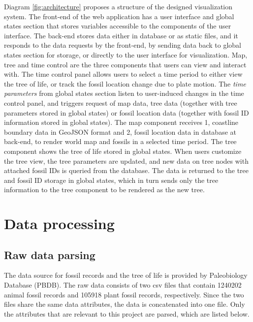 \documentclass[11pt, a4paper,oneside,chapterprefix=false]{scrbook}
\begin{document}
Diagram \ref{fig:architecture} proposes a structure of the designed visualization system. The front-end of the web application has a user interface and global states section that stores variables accessible to the components of the user interface. The back-end stores data either in database or as static files, and it responds to the data requests by the front-end, by sending data back to global states section for storage, or directly to the user interface for visualization. Map, tree and time control are the three components that users can view and interact with. The time control panel allows users to select a time period to either view the tree of life, or track the fossil location change due to plate motion. The \emph{time parameters} from global states section listen to user-induced changes in the time control panel, and triggers request of map data, tree data (together with tree parameters stored in global states) or fossil location data (together with fossil ID information stored in global states). The map component receives 1, coastline boundary data in GeoJSON format and 2, fossil location data in database at back-end, to render world map and fossils in a selected time period. The tree component shows the tree of life stored in global states. When users customize the tree view, the tree parameters are updated, and new data on tree nodes with attached fossil IDs is queried from the database. The data is returned to the tree and fossil ID storage in global states, which in turn sends only the tree information to the tree component to be rendered as the new tree. 

\section{Data processing} \label{sec:tec_data_processing}
\subsection{Raw data parsing} \label{subsec:raw_data_parsing}
The data source for fossil records and the tree of life is provided by Paleobiology Database (PBDB). The raw data consists of two csv files that contain 1240202 animal fossil records and 105918 plant fossil records, respectively. Since the two files share the same data attributes, the data is concatenated into one file. Only the attributes that are relevant to this project are parsed, which are listed below.\\
\end{document}
